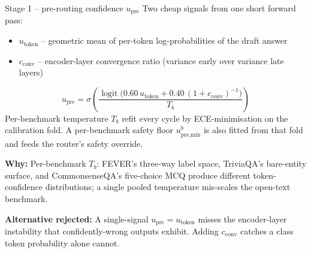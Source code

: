 \documentclass[10pt,aspectratio=169]{beamer}
\newcommand{\why}[1]{{\color{caemamber}\textbf{Why:}} #1}
\newcommand{\altn}[1]{{\color{caemred}\textbf{Alternative rejected:}} #1}
\begin{document}
\begin{frame}{Stage 1 -- pre-routing confidence $u_{\text{pre}}$}
  \footnotesize
  Two cheap signals from one short forward pass:
  \begin{itemize}\small
    \item $u_{\text{token}}$ -- geometric mean of per-token log-probabilities of the draft answer
    \item $c_{\text{conv}}$ -- encoder-layer convergence ratio (variance early over variance late layers)
  \end{itemize}
  \[
    u_{\text{pre}} = \sigma\!\left(\frac{\operatorname{logit}\bigl(0.60\,u_{\text{token}} + 0.40\,(1{+}c_{\text{conv}})^{-1}\bigr)}{T_b}\right)
  \]
  Per-benchmark temperature $T_b$ refit every cycle by ECE-minimisation on the calibration fold. A per-benchmark safety floor $u_{\text{pre,min}}^b$ is also fitted from that fold and feeds the router's safety override.

  \vspace{0.2em}
  \why{Per-benchmark $T_b$: FEVER's three-way label space, TriviaQA's bare-entity surface, and CommonsenseQA's five-choice MCQ produce different token-confidence distributions; a single pooled temperature mis-scales the open-text benchmark.}

  \altn{A single-signal $u_{\text{pre}} = u_{\text{token}}$ misses the encoder-layer instability that confidently-wrong outputs exhibit. Adding $c_{\text{conv}}$ catches a class token probability alone cannot.}
\end{frame}
\end{document}
